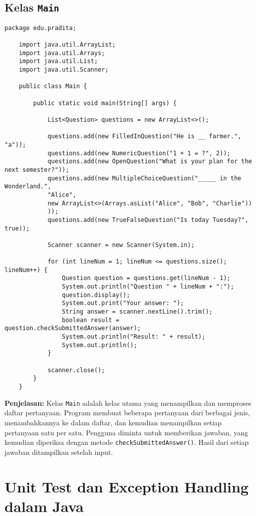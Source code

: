 \subsection{Kelas \texttt{Main}}

\begin{lstlisting}[style=JavaStyle]
	package edu.pradita;
	
	import java.util.ArrayList;
	import java.util.Arrays;
	import java.util.List;
	import java.util.Scanner;
	
	public class Main {
		
		public static void main(String[] args) {
			
			List<Question> questions = new ArrayList<>();
			
			questions.add(new FilledInQuestion("He is __ farmer.", "a"));
			questions.add(new NumericQuestion("1 + 1 = ?", 2));
			questions.add(new OpenQuestion("What is your plan for the next semester?"));
			questions.add(new MultipleChoiceQuestion("_____ in the Wonderland.",
			"Alice",
			new ArrayList<>(Arrays.asList("Alice", "Bob", "Charlie"))
			));
			questions.add(new TrueFalseQuestion("Is today Tuesday?", true));
			
			Scanner scanner = new Scanner(System.in);
			
			for (int lineNum = 1; lineNum <= questions.size(); lineNum++) {
				Question question = questions.get(lineNum - 1);
				System.out.println("Question " + lineNum + ":");
				question.display();
				System.out.print("Your answer: ");
				String answer = scanner.nextLine().trim();
				boolean result = question.checkSubmittedAnswer(answer);
				System.out.println("Result: " + result);
				System.out.println();
			}
			
			scanner.close();
		}
	}
\end{lstlisting}

\textbf{Penjelasan:} Kelas \texttt{Main} adalah kelas utama yang menampilkan dan memproses daftar pertanyaan. Program membuat beberapa pertanyaan dari berbagai jenis, menambahkannya ke dalam daftar, dan kemudian menampilkan setiap pertanyaan satu per satu. Pengguna diminta untuk memberikan jawaban, yang kemudian diperiksa dengan metode \texttt{checkSubmittedAnswer()}. Hasil dari setiap jawaban ditampilkan setelah input.


\section{Unit Test dan Exception Handling dalam Java}

